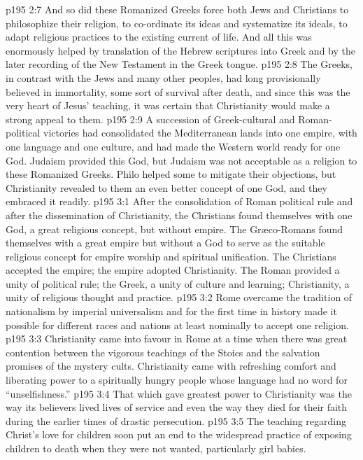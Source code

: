 \vs p195 2:7 And so did these Romanized Greeks force both Jews and Christians to philosophize their religion, to co\hyp{}ordinate its ideas and systematize its ideals, to adapt religious practices to the existing current of life. And all this was enormously helped by translation of the Hebrew scriptures into Greek and by the later recording of the New Testament in the Greek tongue.
\vs p195 2:8 The Greeks, in contrast with the Jews and many other peoples, had long provisionally believed in immortality, some sort of survival after death, and since this was the very heart of Jesus’ teaching, it was certain that Christianity would make a strong appeal to them.
\vs p195 2:9 A succession of Greek\hyp{}cultural and Roman\hyp{}political victories had consolidated the Mediterranean lands into one empire, with one language and one culture, and had made the Western world ready for one God. Judaism provided this God, but Judaism was not acceptable as a religion to these Romanized Greeks. Philo helped some to mitigate their objections, but Christianity revealed to them an even better concept of one God, and they embraced it readily.
\vs p195 3:1 After the consolidation of Roman political rule and after the dissemination of Christianity, the Christians found themselves with one God, a great religious concept, but without empire. The Gr\ae co\hyp{}Romans found themselves with a great empire but without a God to serve as the suitable religious concept for empire worship and spiritual unification. The Christians accepted the empire; the empire adopted Christianity. The Roman provided a unity of political rule; the Greek, a unity of culture and learning; Christianity, a unity of religious thought and practice.
\vs p195 3:2 Rome overcame the tradition of nationalism by imperial universalism and for the first time in history made it possible for different races and nations at least nominally to accept one religion.
\vs p195 3:3 Christianity came into favour in Rome at a time when there was great contention between the vigorous teachings of the Stoics and the salvation promises of the mystery cults. Christianity came with refreshing comfort and liberating power to a spiritually hungry people whose language had no word for “unselfishness.”
\vs p195 3:4 \pc That which gave greatest power to Christianity was the way its believers lived lives of service and even the way they died for their faith during the earlier times of drastic persecution.
\vs p195 3:5 \pc The teaching regarding Christ’s love for children soon put an end to the widespread practice of exposing children to death when they were not wanted, particularly girl babies.

